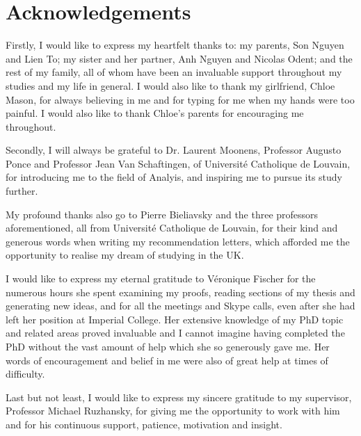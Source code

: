 \chapter*{Acknowledgements}

Firstly, I would like to express my heartfelt thanks to:
my parents, Son Nguyen and Lien To; my sister and her partner, Anh Nguyen and Nicolas Odent; and the rest of my family,
all of whom have been an invaluable support throughout my studies and my life in general.
I would also like to thank my girlfriend, Chloe Mason,
for always believing in me and for typing for me when my hands were too painful.
I would also like to thank Chloe's parents for encouraging me throughout.

Secondly, I will always be grateful to Dr. Laurent Moonens, Professor Augusto Ponce and Professor Jean Van Schaftingen,
of Universit\'e Catholique de Louvain,
for introducing me to the field of Analyis,
and inspiring me to pursue its study further.

My profound thanks also go to Pierre Bieliavsky and the three professors aforementioned,
all from Universit\'e Catholique de Louvain,
for their kind and generous words when writing my recommendation letters,
which afforded me the opportunity to realise my dream of studying in the UK.

I would like to express my eternal gratitude to V\'eronique Fischer for the numerous hours she spent examining my proofs,
reading sections of my thesis and generating new ideas,
and for all the meetings and Skype calls,
even after she had left her position at Imperial College.
Her extensive knowledge of my PhD topic and related areas proved invaluable and
I cannot imagine having completed the PhD without the vast amount of help which she so generously gave me.
Her words of encouragement and belief in me were also of great help at times of difficulty.

Last but not least,
I would like to express my sincere gratitude to my supervisor,
Professor Michael Ruzhansky,
for giving me the opportunity to work with him and for his continuous support, patience, motivation and insight.
